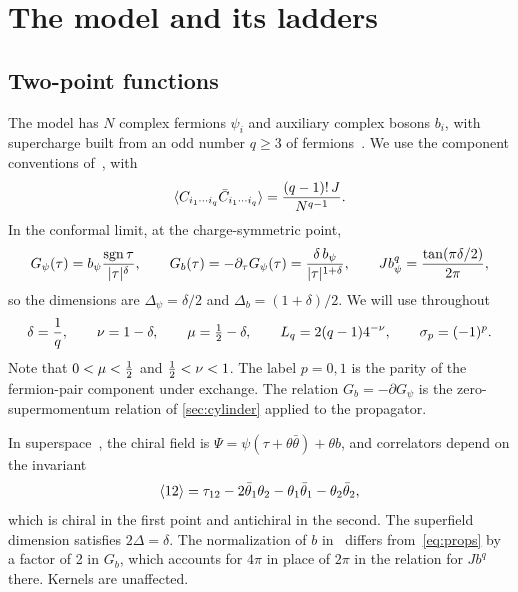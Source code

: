 \section{The model and its ladders}
\label{sec:model}

\subsection{Two-point functions}

The model has $N$ complex fermions $\psi_i$ and auxiliary complex bosons $b_i$, with supercharge built from an odd number $q\ge3$ of fermions~\cite{Fu:2016vas}. We use the component conventions of~\cite{Peng:2017spg}, with
\begin{equation}
\langle C_{i_1\cdots i_q}\bar C_{i_1\cdots i_q}\rangle=\frac{(q-1)!\,J}{N^{q-1}}.
\end{equation}
In the conformal limit, at the charge-symmetric point,
\begin{equation}\label{eq:props}
G_\psi(\tau)=b_\psi\frac{\operatorname{sgn}\tau}{|\tau|^{\delta}},\qquad G_b(\tau)=-\partial_\tau G_\psi(\tau)=\frac{\delta\,b_\psi}{|\tau|^{1+\delta}},\qquad Jb_\psi^q=\frac{\tan(\pi\delta/2)}{2\pi},
\end{equation}
so the dimensions are $\Delta_\psi=\delta/2$ and $\Delta_b=(1+\delta)/2$. We will use throughout
\begin{equation}\label{eq:params}
\delta=\frac1q,\qquad\nu=1-\delta,\qquad\mu=\tfrac12-\delta,\qquad L_q=2(q-1)4^{-\nu},\qquad\sigma_p=(-1)^p.
\end{equation}
Note that $0<\mu<\tfrac12$ and $\tfrac12<\nu<1$. The label $p=0,1$ is the parity of the fermion-pair component under exchange. The relation $G_b=-\partial G_\psi$ is the zero-supermomentum relation of \cref{sec:cylinder} applied to the propagator.

In superspace~\cite{Fu:2016vas,Bulycheva:2018qcp}, the chiral field is $\Psi=\psi(\tau+\theta\bar\theta)+\theta b$, and correlators depend on the invariant
\begin{equation}\label{eq:bracket}
\langle 12\rangle=\tau_{12}-2\bar\theta_1\theta_2-\theta_1\bar\theta_1-\theta_2\bar\theta_2,
\end{equation}
which is chiral in the first point and antichiral in the second. The superfield dimension satisfies $2\Delta=\delta$. The normalization of $b$ in~\cite{Bulycheva:2018qcp} differs from~\eqref{eq:props} by a factor of 2 in $G_b$, which accounts for $4\pi$ in place of $2\pi$ in the relation for $Jb^q$ there. Kernels are unaffected.

